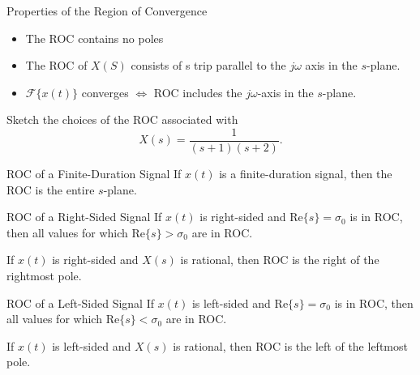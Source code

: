 \begin{frame}{Properties of the Region of Convergence}
    \begin{itemize}
        \item The ROC contains no poles
        \item The ROC of $X(S)$ consists of s trip parallel to the $j\omega$ axis in the $s$-plane.
        \item $\mathcal{F}\{x(t)\}$ converges $\Leftrightarrow$ ROC includes the $j\omega$-axis in the $s$-plane.
    \end{itemize}
\end{frame}


\begin{frame}[t]{}
    \begin{example}
        Sketch the choices of the ROC associated with
        \begin{equation*}
            X(s) = \frac{1}{(s+1)(s+2)}.
        \end{equation*}
    \end{example}
    \pause
    {
        \begin{solution}\end{solution}
            

    }
\end{frame}

\begin{frame}{ROC of a Finite-Duration Signal}
    If $x(t)$ is a finite-duration signal, then the ROC is the entire $s$-plane.

    {
        
    }
\end{frame}


\begin{frame}{ROC of a Right-Sided Signal}
    If $x(t)$ is right-sided and $\mathrm{Re}\{s\} = \sigma_0$ is in ROC, then all values for which $\mathrm{Re}\{s\} > \sigma_0$ are in ROC.

    {
        
    }

    {
        If $x(t)$ is right-sided and $X(s)$ is rational, then ROC is the right of the rightmost pole.
    }
\end{frame}

\begin{frame}{ROC of a Left-Sided Signal}
    If $x(t)$ is left-sided and $\mathrm{Re}\{s\} = \sigma_0$ is in ROC, then all values for which $\mathrm{Re}\{s\} < \sigma_0$ are in ROC.


    {
        If $x(t)$ is left-sided and $X(s)$ is rational, then ROC is the left of the leftmost pole.
    }
\end{frame}

